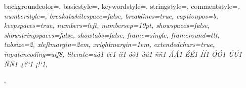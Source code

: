  {
  backgroundcolor=\color{bgCodeColor},
  basicstyle=\ttfamily\small\color{black},
  keywordstyle=\color{kwColor},
  stringstyle=\color{stringColor},
  commentstyle=\color{codeGray}\itshape,
  numberstyle=\tiny\color{black},
  breakatwhitespace=false,
  breaklines=true,
  captionpos=b,
  keepspaces=true,
  numbers=left,
  numbersep=10pt,
  showspaces=false,
  showstringspaces=false,
  showtabs=false,
  frame=single,
  frameround=ttt,
  tabsize=2,
  xleftmargin=2em,
  xrightmargin=1em,
  extendedchars=true,
  inputencoding=utf8,
  literate={á}{{\'a}}1 {é}{{\'e}}1 {í}{{\'i}}1 {ó}{{\'o}}1 {ú}{{\'u}}1
           {ñ}{{\~n}}1 {Á}{{\'A}}1 {É}{{\'E}}1 {Í}{{\'I}}1 {Ó}{{\'O}}1
           {Ú}{{\'U}}1 {Ñ}{{\~N}}1 {¿}{{?`}}1 {¡}{{!`}}1,
}
\lstset{style=codeSnippet}
\renewcommand{\lstlistingname}{\USAL@listing}
\renewcommand{\lstlistlistingname}{\USAL@listoflistings}


\RequirePackage{pgfgantt}
\def\gtt@vgrid@do#1,{%
  \ifx\relax#1\expandafter\@gobble\else\expandafter\@firstofone\fi
  {\ifnum\gtt@currgrid>\gtt@chartwidth
     \expandafter\gtt@vgrid@gobble
   \else
     \gtt@vgrid@analyze#1\relax
     \expandafter\gtt@vgrid@do
   \fi}%
}
\def\gtt@vgrid@gobble#1\relax,{}
\ifx\usal@language\usal@spanishname
  \def\pgfcalendarmonthshortname#1{\ifcase#1\or ene\or feb\or mar\or abr\or may\or jun\or jul\or ago\or sep\or oct\or nov\or dic\fi}
  \def\pgfcalendarmonthname#1{\ifcase#1\or enero\or febrero\or marzo\or abril\or mayo\or junio\or julio\or agosto\or septiembre\or octubre\or noviembre\or diciembre\fi}
\fi


\renewcommand{\arraystretch}{1.15}

